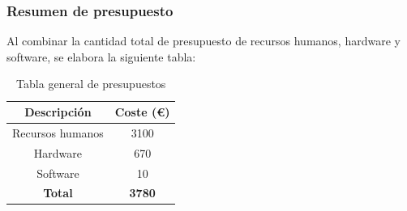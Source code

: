 \subsubsection{Resumen de presupuesto}
Al combinar la cantidad total de presupuesto de recursos humanos, hardware y software, se elabora la siguiente tabla:

\begin{table}[H]
    \centering
    \begin{tabular}{|c|c|}
        \hline
        \rowcolor{lightgray}
        \textbf{Descripción} & \textbf{Coste (€)} \\
        \hline
        Recursos humanos & 3100 \\
        \hline
        Hardware & 670 \\
        \hline
        Software & 10 \\
        \hline
        \textbf{Total} & \textbf{3780} \\
        \hline
    \end{tabular}
    \caption{Tabla general de presupuestos}
    \label{tab:presupuesto-total}
\end{table}
